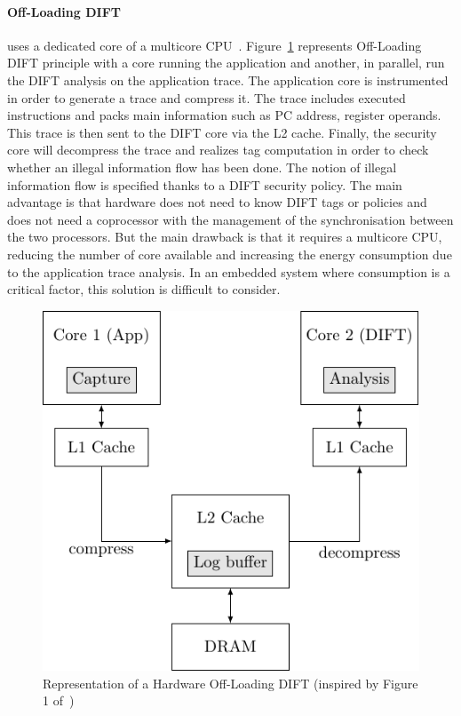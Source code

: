 \paragraph{Off-Loading DIFT} uses a dedicated core of a multicore CPU~\cite{CKSFGMRRRV-08-sigarch,VHYR-08-cca,RGMRCKR-08-spaa}. Figure~\ref{fig:offloading_dift} represents Off-Loading DIFT principle with a core running the application and another, in parallel, run the DIFT analysis on the application trace. The application core is instrumented in order to generate a trace and compress it. The trace includes executed instructions and packs main information such as PC address, register operands. This trace is then sent to the DIFT core via the L2 cache. Finally, the security core will decompress the trace and realizes tag computation in order to check whether an illegal information flow has been done. The notion of illegal information flow is specified thanks to a DIFT security policy.
The main advantage is that hardware does not need to know DIFT tags or policies and does not need a coprocessor with the management of the synchronisation between the two processors.  But the main drawback is that it requires a multicore CPU, reducing the number of core available and increasing the energy consumption due to the application trace analysis. In an embedded system where consumption is a critical factor, this solution is difficult to consider.

\begin{figure}[ht]
    \centering
    \includegraphics{c2_soa/img/offloading.pdf}
    \caption{Representation of a Hardware Off-Loading DIFT (inspired by Figure 1 of~\cite{KDK-09-dsn})}
    \label{fig:offloading_dift}
\end{figure}

